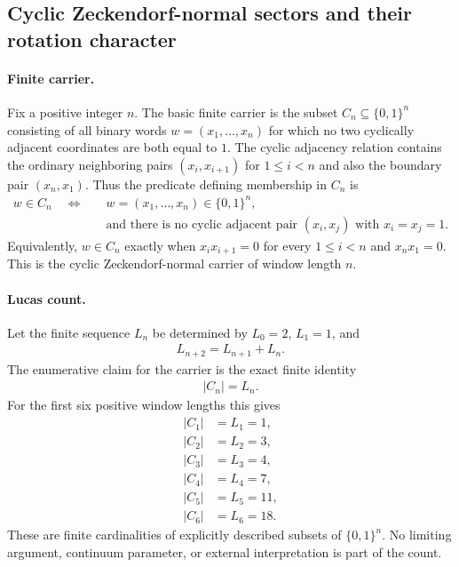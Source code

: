 
\subsection{Cyclic Zeckendorf-normal sectors and their rotation character}
\label{sec:zeckendorf-normal-cyclic-sector-character}

\paragraph{Finite carrier.}
Fix a positive integer $n$. The basic finite carrier is the subset $C_n \subseteq \{0,1\}^n$ consisting of all binary words $w=(x_1,\ldots,x_n)$ for which no two cyclically adjacent coordinates are both equal to $1$. The cyclic adjacency relation contains the ordinary neighboring pairs $(x_i,x_{i+1})$ for $1 \leq i<n$ and also the boundary pair $(x_n,x_1)$. Thus the predicate defining membership in $C_n$ is
$$
\begin{aligned}
w\in C_n
\quad\Longleftrightarrow\quad
& w=(x_1,\ldots,x_n)\in \{0,1\}^n, \\
& \text{and there is no cyclic adjacent pair }(x_i,x_j)\text{ with }x_i=x_j=1.
\end{aligned}
$$
Equivalently, $w\in C_n$ exactly when $x_i x_{i+1}=0$ for every $1\leq i<n$ and $x_nx_1=0$. This is the cyclic Zeckendorf-normal carrier of window length $n$.

\paragraph{Lucas count.}
Let the finite sequence $L_n$ be determined by $L_0=2$, $L_1=1$, and
$$
\begin{aligned}
L_{n+2}=L_{n+1}+L_n.
\end{aligned}
$$
The enumerative claim for the carrier is the exact finite identity
$$
\begin{aligned}
|C_n|=L_n.
\end{aligned}
$$
For the first six positive window lengths this gives
$$
\begin{aligned}
|C_1|&=L_1=1, \\
|C_2|&=L_2=3, \\
|C_3|&=L_3=4, \\
|C_4|&=L_4=7, \\
|C_5|&=L_5=11, \\
|C_6|&=L_6=18.
\end{aligned}
$$
These are finite cardinalities of explicitly described subsets of $\{0,1\}^n$. No limiting argument, continuum parameter, or external interpretation is part of the count.

